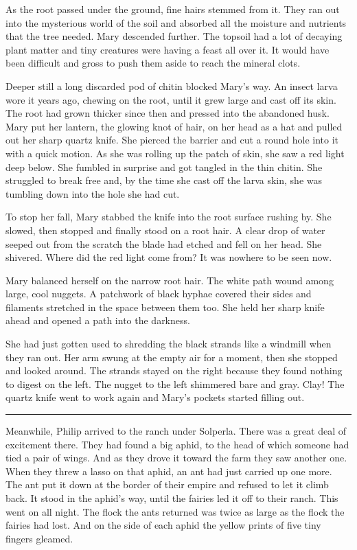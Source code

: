\documentclass[10pt]{memoir}
\renewcommand{\pfbreakdisplay}{\bigskip \ding{166} \bigskip}
\newcommand{\secbreak}{\fancybreak{\pfbreakdisplay}}
\begin{document}
As the root passed under the ground, fine hairs stemmed from it. They ran out
into the mysterious world of the soil and absorbed all the moisture and
nutrients that the tree needed. Mary descended further. The topsoil had a lot
of decaying plant matter and tiny creatures were having a feast all over it. It
would have been difficult and gross to push them aside to reach the mineral
clots.

Deeper still a long discarded pod of chitin blocked Mary's way. An insect
larva wore it years ago, chewing on the root, until it grew large and cast off
its skin. The root had grown thicker since then and pressed into the abandoned
husk. Mary put her lantern, the glowing knot of hair, on her head as a hat and
pulled out her sharp quartz knife. She pierced the barrier and cut a round hole
into it with a quick motion. As she was rolling up the patch of skin, she saw a
red light deep below. She fumbled in surprise and got tangled in the thin
chitin. She struggled to break free and, by the time she cast off the larva
skin, she was tumbling down into the hole she had cut.

To stop her fall, Mary stabbed the knife into the root surface rushing by. She
slowed, then stopped and finally stood on a root hair. A clear drop of water
seeped out from the scratch the blade had etched and fell on her head. She
shivered. Where did the red light come from? It was nowhere to be seen now.

Mary balanced herself on the narrow root hair. The white path wound among
large, cool nuggets. A patchwork of black hyphae covered their sides and
filaments stretched in the space between them too. She held her sharp knife
ahead and opened a path into the darkness.

She had just gotten used to shredding the black strands like a windmill when
they ran out. Her arm swung at the empty air for a moment, then she stopped and
looked around. The strands stayed on the right because they found nothing to
digest on the left. The nugget to the left shimmered bare and gray. Clay! The
quartz knife went to work again and Mary's pockets started filling out.

\secbreak

Meanwhile, Philip arrived to the ranch under Solperla. There was a great deal
of excitement there. They had found a big aphid, to the head of which someone
had tied a pair of wings. And as they drove it toward the farm they saw another
one. When they threw a lasso on that aphid, an ant had just carried up one
more. The ant put it down at the border of their empire and refused to let it
climb back. It stood in the aphid's way, until the fairies led it off to their
ranch. This went on all night. The flock the ants returned was twice as large
as the flock the fairies had lost. And on the side of each aphid the yellow
prints of five tiny fingers gleamed.
\end{document}
